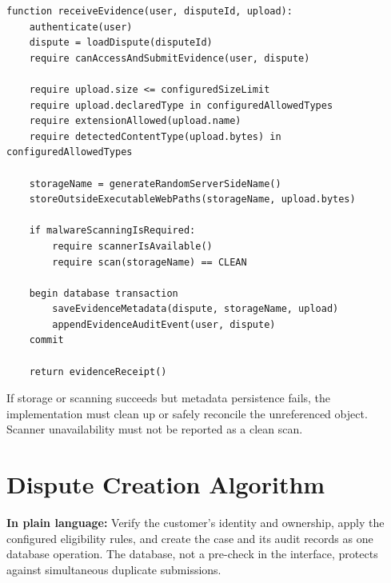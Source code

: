 \documentclass[11pt,a4paper]{article}
\begin{document}
\begin{lstlisting}[style=pseudocode,caption={Validating and recording evidence}]
function receiveEvidence(user, disputeId, upload):
    authenticate(user)
    dispute = loadDispute(disputeId)
    require canAccessAndSubmitEvidence(user, dispute)

    require upload.size <= configuredSizeLimit
    require upload.declaredType in configuredAllowedTypes
    require extensionAllowed(upload.name)
    require detectedContentType(upload.bytes) in configuredAllowedTypes

    storageName = generateRandomServerSideName()
    storeOutsideExecutableWebPaths(storageName, upload.bytes)

    if malwareScanningIsRequired:
        require scannerIsAvailable()
        require scan(storageName) == CLEAN

    begin database transaction
        saveEvidenceMetadata(dispute, storageName, upload)
        appendEvidenceAuditEvent(user, dispute)
    commit

    return evidenceReceipt()
\end{lstlisting}

If storage or scanning succeeds but metadata persistence fails, the
implementation must clean up or safely reconcile the unreferenced
object. Scanner unavailability must not be reported as a clean scan.

\section{Dispute Creation Algorithm}

\textbf{In plain language:} Verify the customer's identity and
ownership, apply the configured eligibility rules, and create the case
and its audit records as one database operation. The database, not a
pre-check in the interface, protects against simultaneous duplicate
submissions.
\end{document}
